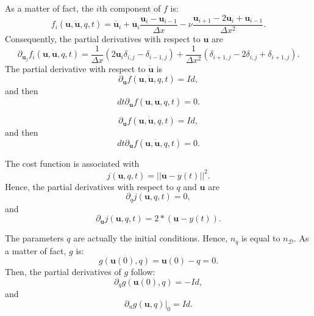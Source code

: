 \documentclass[10pt,openany,onecolumn,a4wide,pof]{article}
\newcommand{\gras}[1]{\boldsymbol{#1}}
\newcommand{\mypar}[1]{\left(#1\right)}
\newcommand{\Nphaz}{n_{\mathcal{D}}} %
\newcommand{\fdyn}{f} %
\newcommand{\costff}{j} %
\newcommand{\obs}{y} %
\newcommand{\point}{\gras{u}} %
\begin{document}
As a matter of fact, the $i$th component of $\fdyn$ is:
$$\fdyn_i\mypar{\point,\dot{\point},q,t} = \dot{\point_i} + \point_i \frac{\point_i - \point_{i-1}}{\Delta x} - \nu \frac{\point_{i+1} -2 \point_i + \point_{i-1}}{\Delta x ^2}. $$
Consequently, the partial derivatives with respect to $\point$ are
$$\partial_{\point_j} \fdyn_i\mypar{\point,\dot{\point},q,t} = \frac{1}{\Delta x }\mypar{2 \point_i \delta_{i,j} - \delta_{i-1,j}} + \frac{1}{\Delta x ^2}\mypar{\delta_{i+1,j} - 2 \delta_{i,j} + \delta_{i+1,j}}.$$
The partial derivative with respect to $\dot{\point}$ is
$$\partial_{\dot{\point}} \fdyn\mypar{\point,\dot{\point},q,t}  = Id,$$
and then $$dt\partial_{\dot{\point}} \fdyn\mypar{\point,\dot{\point},q,t}  = 0. $$

$$\partial_{\dot{\point}} \fdyn\mypar{\point,\dot{\point},q,t}  = Id,$$
and then $$dt\partial_{\dot{\point}} \fdyn\mypar{\point,\dot{\point},q,t}  = 0. $$

The cost function is associated with
$$\costff\mypar{\point,q,t} = || \point-\obs(t)||^2.$$
Hence, the partial derivatives with respect to $q$ and $\point$ are
$$\partial_q \costff\mypar{\point,q,t} = 0,$$
and
$$\partial_{\point} \costff\mypar{\point,q,t} = 2*\mypar{\point-\obs(t)}.$$

The parameters $q$ are actually the initial conditions. Hence, $n_q$ is equal to $\Nphaz$. As a matter of fact, $g$ is:
$$g(\point(0),q) = \point(0)-q = 0.$$
Then, the partial derivatives of $g$ follow:
$$\partial_q g(\point(0),q) = -Id,$$
and
$$\partial_u g(\point,q)|_0 = Id.$$
\end{document}
